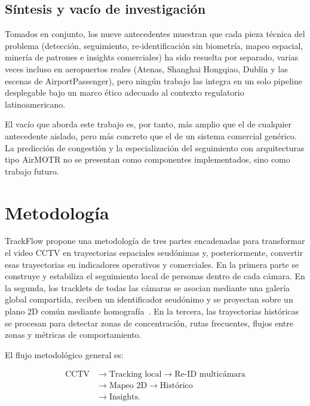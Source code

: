\documentclass[12pt,a4paper]{article}
\begin{document}
\subsection{Síntesis y vacío de investigación}

Tomados en conjunto, los nueve antecedentes muestran que cada pieza
técnica del problema (detección, seguimiento, re-identificación sin
biometría, mapeo espacial, minería de patrones e insights comerciales) ha
sido resuelta por separado, varias veces incluso en aeropuertos reales
(Atenas, Shanghai Hongqiao, Dublín y las escenas de AirportPassenger),
pero ningún trabajo las integra en un solo pipeline desplegable bajo un
marco ético adecuado al contexto regulatorio latinoamericano.

El vacío que aborda este trabajo es, por tanto, más amplio que el de
cualquier antecedente aislado, pero más concreto que el de un sistema
comercial genérico. La predicción de
congestión y la especialización del seguimiento con arquitecturas tipo
AirMOTR no se presentan como componentes implementados, sino como trabajo
futuro.

\section{Metodología}
\label{sec:metodologia}

TrackFlow propone una metodología de tres partes encadenadas para
transformar el video CCTV en trayectorias espaciales seudónimas y,
posteriormente, convertir esas trayectorias en indicadores operativos y
comerciales. En la primera parte se construye y estabiliza el seguimiento
local de personas dentro de cada cámara. En la segunda, los tracklets de
todas las cámaras se asocian mediante una galería global compartida,
reciben un identificador seudónimo y se proyectan sobre un plano 2D común
mediante homografía~\cite{hartley2004}. En la tercera, las trayectorias históricas se
procesan para detectar zonas de concentración, rutas frecuentes, flujos
entre zonas y métricas de comportamiento.

El flujo metodológico general es:

\begin{equation}
\begin{aligned}
\text{CCTV}
&\rightarrow \text{Tracking local}
\rightarrow \text{Re-ID multicámara} \\
&\rightarrow \text{Mapeo 2D}
\rightarrow \text{Histórico} \\
&\rightarrow \text{Insights}.
\end{aligned}
\end{equation}
\end{document}

